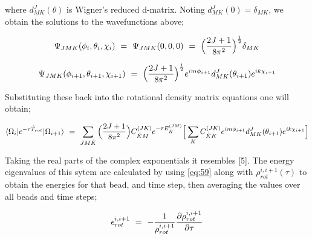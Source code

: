 \documentclass{ece}
\begin{document}
where \begin{math} d_{MK}^{J} (\theta ) \end{math} is Wigner's reduced d-matrix. Noting \begin{math} d_{MK}^{J} ( 0 ) = \delta_{MK} \end{math}, we obtain the solutions to the wavefunctions above;

\begin{equation}
    \Psi_{JMK} ( \phi_{i} , \theta_{i}, \chi_{i} ) \hspace{0.125cm} = \hspace{0.125cm} \Psi_{JMK} ( 0 , 0 , 0 ) \hspace{0.125cm} = \hspace{0.125cm} \Big( \frac{2 J + 1}{8 \pi^2} \Big)^{\frac{1}{2}} \delta_{MK}
\end{equation}

\begin{equation}
    \Psi_{JMK} ( \phi_{i+1} , \theta_{i+1}, \chi_{i+1} ) \hspace{0.125cm} = \hspace{0.125cm} \Big( \frac{2 J + 1}{8 \pi^2} \Big)^{\frac{1}{2}} e^{i m \phi_{i+1}} d_{MK}^{J} (\theta_{i+1} )  e^{i k \chi_{i+1}}
\end{equation}

Substituting these back into the rotational density matrix equations one will obtain;

\begin{equation}
    \langle \Omega_{i} | e^{- \tau \hat{T}_{rot}} | \Omega_{i+1} \rangle \hspace{0.125cm} = \hspace{0.125cm} \sum_{J M \hat{K}} \Big( \frac{2 J + 1}{8 \pi^2} \Big) C_{\hat{K} M}^{(JK)} e^{- \tau E_{\hat{K}}^{(JM)}} \Big[ \sum_{K} C_{\hat{K} K}^{(JK)} e^{i m \phi_{i+1}} d_{MK}^{J} (\theta_{i+1} )  e^{i k \chi_{i+1}} \Big]
\end{equation}

Taking the real parts of the complex exponentials it resembles  [5]. The energy eigenvalues of this sytem are calculated by using \ref{eq:59} along with \begin{math} \rho_{rot}^{i, i+1} ( \tau ) \end{math} to obtain the energies for that bead, and time step, then averaging the values over all beads and time steps;

\begin{equation}
     \epsilon_{rot}^{i, i+1} \hspace{0.125cm} = \hspace{0.125cm} - \frac{1}{\rho_{rot}^{i, i+1}} \frac{\partial{\rho_{rot}^{i, i+1}}}{\partial{\tau}} 
\end{equation}
\end{document}
